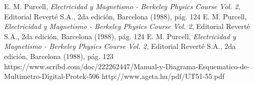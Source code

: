 \documentclass[twoside,twocolumn,a4paper]{article}
\begin{document}

\begin{thebibliography}{99} %

 E. M. Purcell, \textit{Electricidad y Magnetismo - Berkeley Physics Course Vol. 2}, Editorial Revert\'e S.A., 2da edici\'on, Barcelona (1988), p\'ag. 124
 E. M. Purcell, \textit{Electricidad y Magnetismo - Berkeley Physics Course Vol. 2}, Editorial Revert\'e S.A., 2da edici\'on, Barcelona (1988), p\'ag. 124
 E. M. Purcell, \textit{Electricidad y Magnetismo - Berkeley Physics Course Vol. 2}, Editorial Revert\'e S.A., 2da edici\'on, Barcelona (1988), p\'ag. 123
 https://www.scribd.com/doc/222262447/Manual-y-Diagrama-Esquematico-de-Multimetro-Digital-Protek-506
 http://www.ageta.hu/pdf/UT51-55.pdf
 
\end{thebibliography}

\end{document}
